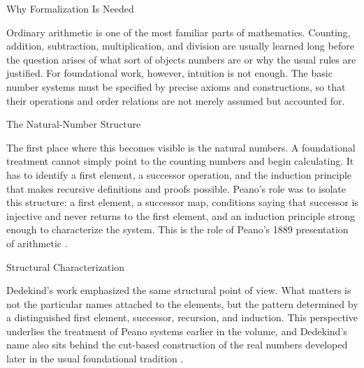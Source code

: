 
\begin{topicbox}{Why Formalization Is Needed}
\begin{exposition}
Ordinary arithmetic is one of the most familiar parts of mathematics. Counting,
addition, subtraction, multiplication, and division are usually learned long before
the question arises of what
sort of objects numbers are or why the usual rules are justified. For
foundational work, however, intuition is not enough. The basic number systems
must be specified by precise axioms and constructions, so that their
operations and order relations are not merely assumed but accounted for.
\end{exposition}
\end{topicbox}

\begin{topicbox}{The Natural-Number Structure}
\begin{exposition}
The first place where this becomes visible is the natural numbers. A
foundational treatment cannot simply point to the counting numbers and begin
calculating. It has to identify a first element, a successor operation, and
the induction principle that makes recursive definitions and proofs possible.
Peano's role was to isolate this structure: a first element, a successor map,
conditions saying that successor is injective and never returns to the first
element, and an induction principle strong enough to characterize the system.
This is the role of Peano's 1889 presentation of arithmetic
\citep{PeanoArithmeticesPrincipia1889}.
\end{exposition}
\end{topicbox}

\begin{topicbox}{Structural Characterization}
\begin{exposition}
Dedekind's work emphasized the same structural point of view. What matters is
not the particular names attached to the elements, but the pattern determined
by a distinguished first element, successor, recursion, and induction. This
perspective underlies the treatment of Peano systems earlier in the volume,
and Dedekind's name also sits behind the cut-based construction of the real
numbers developed later in the usual foundational tradition
\citep{dedekind1901essays}.
\end{exposition}
\end{topicbox}


